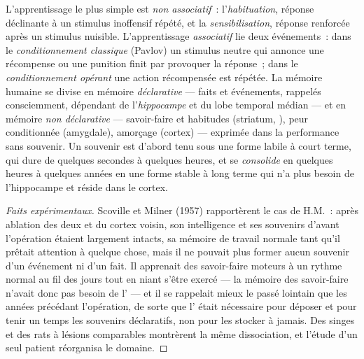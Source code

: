 \begin{definition}\label{def:b3:learning-memory:kinds}
L'apprentissage le plus simple est \emph{non associatif}~:
l'\emph{habituation}, réponse déclinante à un stimulus inoffensif
répété, et la \emph{sensibilisation}, réponse renforcée après un
stimulus nuisible. L'apprentissage \emph{associatif} lie deux
événements~: dans le \emph{conditionnement classique} (Pavlov) un
stimulus neutre qui annonce une récompense ou une punition finit par
provoquer la réponse~; dans le \emph{conditionnement opérant} une action
récompensée est répétée. La mémoire humaine se divise en mémoire
\emph{déclarative} --- faits et événements, rappelés consciemment,
dépendant de l'\emph{hippocampe} et du lobe temporal médian --- et en
mémoire \emph{non déclarative} --- savoir-faire et habitudes (striatum,
), peur conditionnée (amygdale), amorçage (cortex) ---
exprimée dans la performance sans souvenir. Un souvenir est d'abord
tenu sous une forme labile à court terme, qui dure de quelques secondes
à quelques heures, et se \emph{consolide} en quelques heures à quelques
années en une forme stable à long terme qui n'a plus besoin de
l'hippocampe et réside dans le cortex.
\end{definition}

\begin{proof}[Faits expérimentaux]
Scoville et Milner (1957) rapportèrent le cas de H.M.~: après ablation
des deux  et du cortex voisin, son intelligence et ses
souvenirs d'avant l'opération étaient largement intacts, sa mémoire de
travail normale tant qu'il prêtait attention à quelque chose, mais il ne
pouvait plus former aucun souvenir d'un événement ni d'un fait. Il
apprenait des savoir-faire moteurs à un rythme normal au fil des jours
tout en niant s'être exercé --- la mémoire des savoir-faire n'avait donc
pas besoin de l' --- et il se rappelait mieux le passé
lointain que les années précédant l'opération, de sorte que l'
était nécessaire pour déposer et pour tenir un temps les souvenirs
déclaratifs, non pour les stocker à jamais. Des singes et des rats à
lésions comparables montrèrent la même dissociation, et l'étude d'un
seul patient réorganisa le domaine.
\end{proof}

